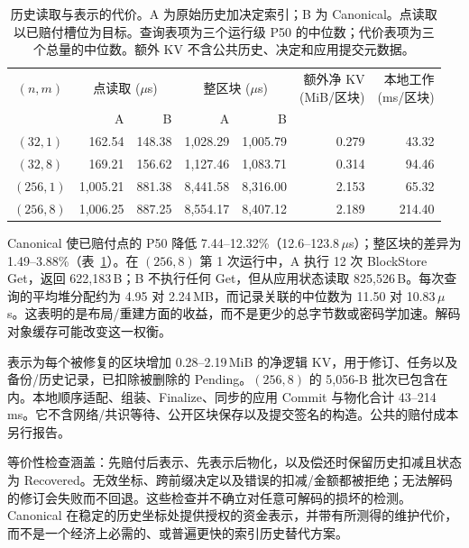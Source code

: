 \begin{table}[t]
  \caption{历史读取与表示的代价。A 为原始历史加决定索引；B 为 Canonical。点读取以已赔付槽位为目标。查询表项为三个运行级 P50 的中位数；代价表项为三个总量的中位数。额外 KV 不含公共历史、决定和应用提交元数据。}
  \label{tab:eval-reader}
  \centering
  \small
  \setlength{\tabcolsep}{8pt}
  \begin{tabular}{@{}crrrrrr@{}}
    \toprule
    $(n,m)$ &
    \multicolumn{2}{c}{点读取 ($\mu$s)} &
    \multicolumn{2}{c}{整区块 ($\mu$s)} &
    \shortstack{额外净 KV\\(MiB/区块)} &
    \shortstack{本地工作\\(ms/区块)} \\
    \cmidrule(lr){2-3}\cmidrule(lr){4-5}
    & A & B & A & B & & \\
    \midrule
    $(32,1)$  & 162.54  & 148.38 & 1,028.29 & 1,005.79 & 0.279 & 43.32 \\
    $(32,8)$  & 169.21  & 156.62 & 1,127.46 & 1,083.71 & 0.314 & 94.46 \\
    $(256,1)$ & 1,005.21 & 881.38 & 8,441.58 & 8,316.00 & 2.153 & 65.32 \\
    $(256,8)$ & 1,006.25 & 887.25 & 8,554.17 & 8,407.12 & 2.189 & 214.40 \\
    \bottomrule
  \end{tabular}
\end{table}

Canonical 使已赔付点的 P50 降低 7.44--12.32\%（12.6--123.8\,$\mu$s）；整区块的差异为 1.49--3.88\%（表~\ref{tab:eval-reader}）。在 $(256,8)$ 第 1 次运行中，A 执行 12 次 BlockStore Get，返回 622,183\,B；B 不执行任何 Get，但从应用状态读取 825,526\,B。每次查询的平均堆分配约为 4.95 对 2.24\,MB，而记录关联的中位数为 11.50 对 10.83\,$\mu$s。这表明的是布局/重建方面的收益，而不是更少的总字节数或密码学加速。解码对象缓存可能改变这一权衡。

表示为每个被修复的区块增加 0.28--2.19\,MiB 的净逻辑 KV，用于修订、任务以及备份/历史记录，已扣除被删除的 Pending。$(256,8)$ 的 5,056-B 批次已包含在内。本地顺序适配、组装、Finalize、同步的应用 Commit 与物化合计 43--214\,ms。它不含网络/共识等待、公开区块保存以及提交签名的构造。公共的赔付成本另行报告。

等价性检查涵盖：先赔付后表示、先表示后物化，以及偿还时保留历史扣减且状态为 Recovered。无效坐标、跨前缀决定以及错误的扣减/金额都被拒绝；无法解码的修订会失败而不回退。这些检查并不确立对任意可解码的损坏的检测。Canonical 在稳定的历史坐标处提供授权的资金表示，并带有所测得的维护代价，而不是一个经济上必需的、或普遍更快的索引历史替代方案。

